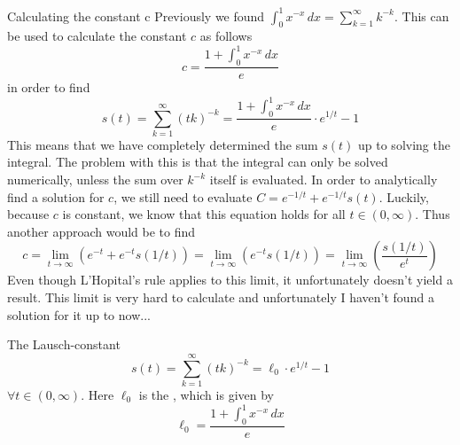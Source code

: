 \documentclass[11pt, xcolor=dvipsnames]{beamer}
\begin{document}
\begin{frame}{Calculating the constant c}
Previously we found $\int_0^1 x^{-x} \,dx = \sum_{k=1}^{\infty} k^{-k}$. This can be used to calculate the constant $c$ as follows
\begin{equation}
    c = \frac{1+\int_0^1 x^{-x} \,dx}{e}
\end{equation}
    in order to find
    \begin{equation}
        s(t) = \sum_{k=1}^{\infty} (tk)^{-k} = \frac{1+\int_0^1 x^{-x} \,dx}{e} \cdot e^{1/t} - 1
    \end{equation}
This means that we have completely determined the sum $s(t)$ up to solving the integral. The problem with this is that the integral can only be solved numerically, unless the sum over $k^{-k}$ itself is evaluated. In order to analytically find a solution for $c$, we still need to evaluate $C = e^{-1/t} + e^{-1/t} s(t)$. Luckily, because $c$ is constant, we know that this equation holds for all $t\in (0,\infty )$. Thus another approach would be to find
\begin{equation}
    c = \lim_{t\rightarrow \infty}\left( e^{-t} + e^{-t} s(1/t)\right) = \lim_{t\rightarrow \infty}\left( e^{-t} s(1/t)\right) =\lim_{t\rightarrow \infty}\left( \frac{s(1/t)}{e^t}\right)
\end{equation}
Even though L'Hopital's rule applies to this limit, it unfortunately doesn't yield a result. This limit is very hard to calculate and unfortunately I haven't found a solution for it up to now...    
\end{frame}
\begin{frame}{The Lausch-constant}
    \begin{equation}
       \boxed{ s(t) = \sum_{k=1}^{\infty} (tk)^{-k} = \ell_0 \cdot e^{1/t} - 1}
    \end{equation}
    $\forall t \in (0, \infty )$. Here $\ell_0$ is the , which is given by 
    \begin{equation}
        \boxed{\ell_0 = \frac{1+\int_0^1 x^{-x} \,dx}{e}}
    \end{equation}
\end{frame}
\end{document}
